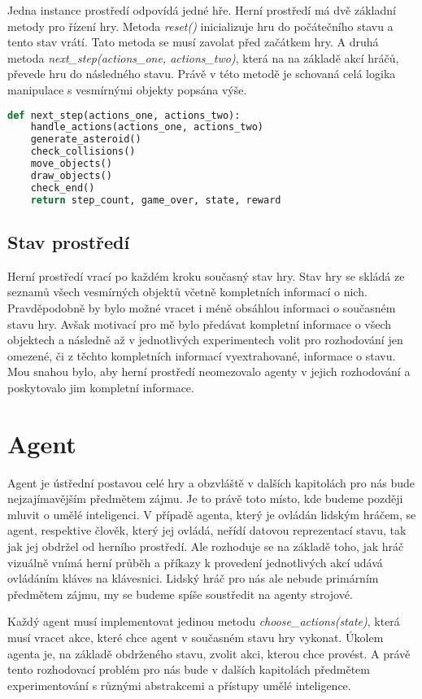 Jedna instance prostředí odpovídá jedné hře. Herní prostředí má dvě základní metody pro řízení hry. 
\newline 
Metoda \emph{reset()} inicializuje hru do počátečního stavu a tento stav vrátí. Tato metoda se musí zavolat před začátkem hry.
\newline 
A druhá metoda \emph{next\_step(actions\_one, actions\_two)}, která na na základě akcí hráčů, převede hru do následného stavu.
Právě v této metodě je schovaná celá logika manipulace s vesmírnými objekty popsána výše.
\newline
\begin{lstlisting}[language=Python]
def next_step(actions_one, actions_two):
    handle_actions(actions_one, actions_two)
    generate_asteroid()
    check_collisions()
    move_objects()
    draw_objects()
    check_end()
    return step_count, game_over, state, reward    
\end{lstlisting}
\newpage



\subsection{Stav prostředí}
Herní prostředí vrací po každém kroku současný stav hry. Stav hry se skládá ze seznamů všech vesmírných objektů včetně kompletních informací o nich.
Pravděpodobně by bylo možné vracet i méně obsáhlou informaci o současném stavu hry. 
Avšak motivací pro mě bylo předávat kompletní informace o všech objektech a následně až v jednotlivých experimentech volit pro rozhodování jen omezené, či z těchto kompletních informací vyextrahované, informace o stavu.
Mou snahou bylo, aby herní prostředí neomezovalo agenty v jejich rozhodování a poskytovalo jim kompletní informace.


\section{Agent}
Agent je ústřední postavou celé hry a obzvláště v dalších kapitolách pro nás bude nejzajímavějším předmětem zájmu.
Je to právě toto místo, kde budeme později mluvit o umělé inteligenci. 
V případě agenta, který je ovládán lidským hráčem, se agent, respektive člověk, který jej ovládá, neřídí datovou reprezentací stavu, tak jak jej obdržel od herního prostředí.
Ale rozhoduje se na základě toho, jak hráč vizuálně vnímá herní průběh a příkazy k provedení jednotlivých akcí udává ovládáním kláves na klávesnici.
Lidský hráč pro nás ale nebude primárním předmětem zájmu, my se budeme spíše soustředit na agenty strojové.
\par
Každý agent musí implementovat jedinou metodu \emph{choose\_actions(state)}, která musí vracet akce, které chce agent v současném stavu hry vykonat. Úkolem agenta je, na základě obdrženého stavu, zvolit akci, kterou chce provést.
A právě tento rozhodovací problém pro nás bude v dalších kapitolách předmětem experimentování s různými abstrakcemi a přístupy umělé inteligence. 



